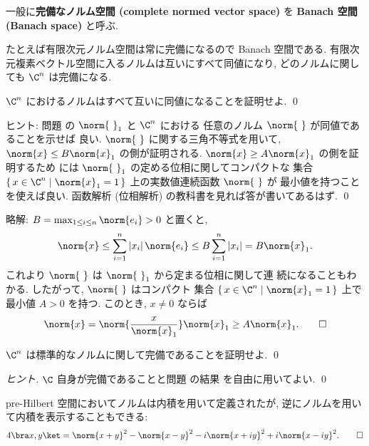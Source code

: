 \documentclass[12pt,twoside]{jarticle}
\newcommand\commentout[1]{#1}
\newcommand\commentout[1]{}
\begin{document}
一般に{\bf 完備なノルム空間 (complete normed vector space)} を 
{\bf Banach 空間 (Banach space)} と呼ぶ. 

たとえば有限次元ノルム空間は常に完備になるので Banach 空間である. 
有限次元複素ベクトル空間に入るノルムは互いにすべて同値になり, 
どのノルムに関しても $\C^n$ は完備になる.

\begin{question}[20点]
\label{q:norm-equiv}
  $\C^n$ におけるノルムはすべて互いに同値になることを証明せよ. \qed
\end{question}

\noindent
ヒント: 問題  の $\norm{{\ }}_1$ と $\C^n$ における
任意のノルム $\norm{{\ }}$ が同値であることを示せば
良い.  $\norm{{\ }}$ に関する三角不等式を用いて, $\norm{x}\le B \norm{x}_1$ 
の側が証明される.  $\norm{x}\ge A \norm{x}_1$ の側を証明するため
には $\norm{{\ }}_1$ の定める位相に関してコンパクトな
集合 $\{\,x\in\C^n\mid\norm{x}_1=1\,\}$ 上の実数値連続函数 $\norm{{\ }}$ が
最小値を持つことを使えば良い.
函数解析 (位相解析) の教科書を見れば答が書いてあるはず.
\qed

\commentout{
\medskip
\noindent
略解: $B=\max_{1\le i\le n}\norm{e_i} > 0$ と置くと,
\begin{equation*}
  \norm{x} 
  \le \sum_{i=1}^n |x_i|\,\norm{e_i} 
  \le B \sum_{i=1}^n |x_i|
  = B \norm{x}_1.
\end{equation*}
これより $\norm{{\ }}$ は $\norm{{\ }}_1$ から定まる位相に関して連
続になることもわかる.  したがって, $\norm{{\ }}$ はコンパクト
集合 $\{\,x\in\C^n\mid\norm{x}_1=1\,\}$ 上で最小値 $A>0$ を持つ. 
このとき, $x\ne0$ ならば
\begin{equation*}
  \norm{x}
  = \norm{\frac{x}{\norm{x}_1}} \norm{x}_1
  \ge A \norm{x}_1.
  \qed
\end{equation*}
}


\begin{question}[10点]
  $\C^n$ は標準的なノルムに関して完備であることを証明せよ. \qed
\end{question}

\begin{proof}[ヒント]
  $\C$ 自身が完備であることと問題  の結果
  を自由に用いてよい. 
  \qed
\end{proof}


\begin{question}[10点]
\label{q:inner=norm}
  pre-Hilbert 空間においてノルムは内積を用いて定義されたが, 
  逆にノルムを用いて内積を表示することもできる:
  \begin{equation*}
    4\bra x,y\ket 
    = \norm{x+y}^2 - \norm{x-y}^2 - i\norm{x+iy}^2 + i\norm{x-iy}^2.
    \qed
  \end{equation*}
\end{question}
\end{document}

